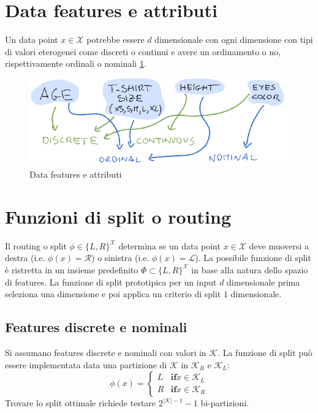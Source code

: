 \section{Data features e attributi}
Un data point $x\in\mathcal{X}$ potrebbe essere $d$ dimensionale con ogni dimensione con tipi di valori eterogenei come discreti o continui e avere un ordinamento o no, rispettivamente ordinali o nominali \ref{fig:chapter05-06}.

\begin{figure}
	\centering
	\includegraphics[width=0.6\linewidth]{imgs/chapter5/img6}
	\caption{Data features e attributi}
	\label{fig:chapter05-06}
\end{figure}

\section{Funzioni di split o routing}
Il routing o split $\phi\in\{L,R\}^{\mathcal{X}}$ determina se un data point $x\in\mathcal{X}$ deve muoversi a destra (i.e. $\phi(x)=\mathcal{R}$) o sinistra (i.e. $\phi(x)=\mathcal{L}$).
La possibile funzione di split \`e ristretta in un insieme predefinito $\Phi\subset\{L,R\}^\mathcal{X}$ in base alla natura dello spazio di features.
La funzione di split prototipica per un input $d$ dimensionale prima seleziona una dimensione e poi applica un criterio di split $1$ dimensionale.

	\subsection{Features discrete e nominali}
	Si assumano features discrete e nominali con valori in $\mathcal{K}$.
	La funzione di split pu\`o essere implementata data una partizione di $\mathcal{K}$ in $\mathcal{K}_R$ e $\mathcal{K}_L$:
	$$\phi(x) = \begin{cases}L &\mathbf{if} x\in\mathcal{K}_L\\
		R &\mathbf{if} x\in\mathcal{K}_R
	\end{cases}$$
	Trovare lo split ottimale richiede testare $2^{|\mathcal{K}|-1}-1$ bi-partizioni.
	
